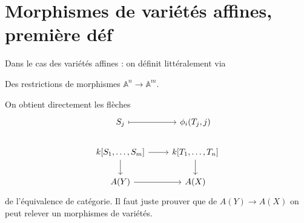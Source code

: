 \documentclass[a4paper,12pt]{book}
\newcommand{\A}{\mathbb{A}}
\theoremstyle{plain}
\theoremstyle{definition}
\theoremstyle{remark}
\begin{document}
\section{Morphismes de variétés affines, première déf}
Dans le cas des variétés affines : on définit littéralement via 
\begin{center}
    Des restrictions de morphismes $\A^n\to \A^m$.
\end{center}
On obtient directement les flèches 
\[\begin{tikzcd}
	{S_j} & {\phi_i(T_j,j)} \\
	{k[S_1,\ldots,S_m]} & {k[T_1,\ldots,T_n]} \\
	{A(Y)} & {A(X)}
	\arrow[maps to, from=1-1, to=1-2]
	\arrow[from=2-1, to=2-2]
	\arrow[from=2-1, to=3-1]
	\arrow[from=2-2, to=3-2]
	\arrow[from=3-1, to=3-2]
\end{tikzcd}\]
de l'équivalence de catégorie. Il faut juste prouver que de 
$A(Y)\to A(X)$ on peut relever un morphismes de variétés.




\printbibliography
\end{document}

